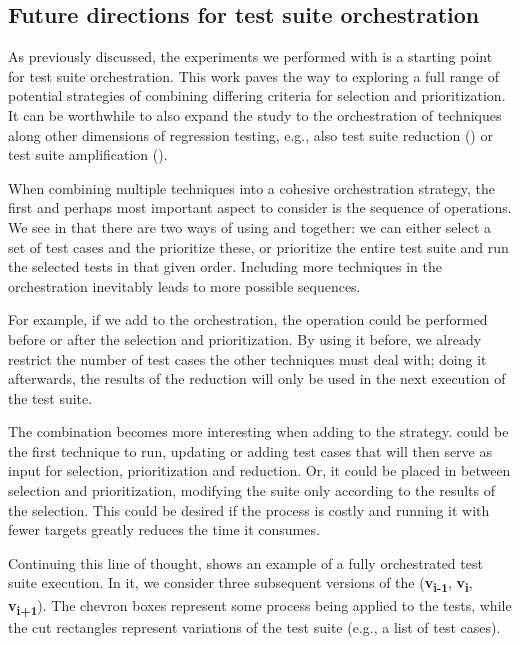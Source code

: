 \subsection{Future directions for test suite orchestration}

As previously discussed, the experiments we performed with \fz is a starting point for test suite orchestration.
This work paves the way to exploring a full range of potential strategies of combining differing criteria for selection and prioritization. 
It can be worthwhile to also expand the study to the orchestration of techniques along other dimensions of regression testing, e.g., also test suite reduction (\tsr) or test suite amplification (\tsa).

When combining multiple techniques into a cohesive orchestration strategy, the first and perhaps most important aspect to consider is the sequence of operations.
We see in  that there are two ways of using \tcs and \tcp together: we can either select a set of test cases and the prioritize these, or prioritize the entire test suite and run the selected tests in that given order.
Including more techniques in the orchestration inevitably leads to more possible sequences.

For example, if we add \tsr to the orchestration, the operation could be performed before or after the selection and prioritization.
By using it before, we already restrict the number of test cases the other techniques must deal with; doing it afterwards, the results of the reduction will only be used in the next execution of the test suite.

The combination becomes more interesting when adding \tsa to the strategy.
\tsa could be the first technique to run, updating or adding test cases that will then serve as input for selection, prioritization and reduction.
Or, it could be placed in between selection and prioritization, modifying the suite only according to the results of the selection.
This could be desired if the \tsa process is costly and running it with fewer targets greatly reduces the time it consumes.

Continuing this line of thought,  shows an example of a fully orchestrated test suite execution.
In it, we consider three subsequent versions of the \sut (\textbf{v\textsubscript{i-1}}, \textbf{v\textsubscript{i}}, \textbf{v\textsubscript{i+1}}).
The chevron boxes represent some process being applied to the tests, while the cut rectangles represent variations of the test suite (e.g., a list of test cases).

